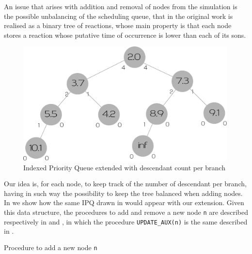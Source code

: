 \documentclass[12pt,a4paper,twoside,openright]{book}
\begin{document}
An issue that arises with addition and removal of nodes from the simulation is the possible unbalancing of the scheduling queue, that in the original work is realised as a binary tree of reactions, whose main property is that each node stores a reaction whose putative time of occurrence is lower than each of its sons.

\begin{figure}%
  \begin{center}
    \includegraphics[width=0.99\textwidth]{img/extipq.pdf}
    \caption{Indexed Priority Queue extended with descendant count per branch}
    \label{img:ipq}
  \end{center}
\end{figure}

Our idea is, for each node, to keep track of the number of descendant per branch, having in such way the possibility to keep the tree balanced when adding nodes. In  we show how the same IPQ drawn in \cite{gibson2000} would appear with our extension. Given this data structure, the procedures to add and remove a new node \texttt{n} are described respectively in  and , in which the procedure \texttt{UPDATE\_AUX(n)} is the same described in \cite{gibson2000}.

\begin{algorithm}
\begin{distribalgo}[1]
\vspace{5pt}
\ELSE
    \ELSE
    \ENDIF
    \ELSE
    \ENDIF
  \ENDWHILE
\ENDIF
\caption{Procedure to add a new node \texttt{n}}
\label{algo:newnode}
\end{distribalgo}
\end{algorithm}
\end{document}
